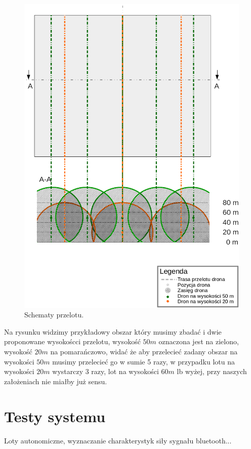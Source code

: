 \begin{figure}[!th]
    \centering
    \includegraphics[width=15cm]{zalaczniki/obrazy/schemat_przelotu.png}
    \caption{Schematy przelotu.}
    \label{fig:schematprzelotu}
\end{figure}

Na rysunku widzimy przykładowy obszar który musimy zbadać i dwie proponowane wysokoścci przelotu, wysokość $50 m$ oznaczona jest na zielono, wysokość $20 m$ na pomarańczowo, widać że aby przelecieć zadany obszar na wysokości $50 m$ musimy przelecieć go w sumie 5 razy, w przypadku lotu na wysokości $20 m$ wystarczy 3 razy, lot na wysokości $60 m$ lb wyżej, przy naszych założeniach nie miałby już sensu.

\section{Testy systemu}
Loty autonomiczne, wyznaczanie charakterystyk siły sygnału bluetooth...

